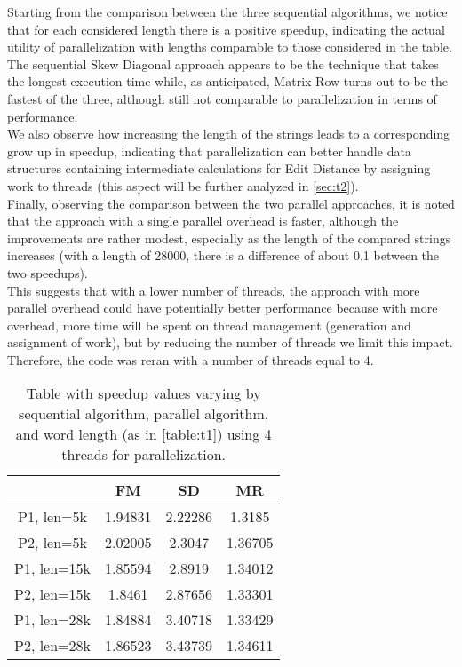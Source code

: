 \documentclass[10pt,twocolumn,letterpaper]{article}
\begin{document}
Starting from the comparison between the three sequential algorithms, we notice that for each considered length there is a positive speedup, indicating the actual utility of parallelization with lengths comparable to those considered in the table. The sequential Skew Diagonal approach appears to be the technique that takes the longest execution time while, as anticipated, Matrix Row turns out to be the fastest of the three, although still not comparable to parallelization in terms of performance.\\
We also observe how increasing the length of the strings leads to a corresponding grow up in speedup, indicating that parallelization can better handle data structures containing intermediate calculations for Edit Distance by assigning work to threads (this aspect will be further analyzed in \cref{sec:t2}).\\
Finally, observing the comparison between the two parallel approaches, it is noted that the approach with a single parallel overhead is faster, although the improvements are rather modest, especially as the length of the compared strings increases (with a length of 28000, there is a difference of about 0.1 between the two speedups).\\
This suggests that with a lower number of threads, the approach with more parallel overhead could have potentially better performance because with more overhead, more time will be spent on thread management (generation and assignment of work), but by reducing the number of threads we limit this impact.\\
Therefore, the code was reran with a number of threads equal to 4.

\begin{table}[h]
\centering
\begin{tabular}{ |c|c|c|c| } 
\hline
 & FM & SD & MR\\
\hline
P1, len=5k & 1.94831 & 2.22286 & 1.3185\\
\hline
P2, len=5k & 2.02005 & 2.3047 & 1.36705\\
\hline
P1, len=15k & 1.85594 & 2.8919 & 1.34012\\
\hline
P2, len=15k & 1.8461 & 2.87656 & 1.33301\\
\hline
P1, len=28k & 1.84884 & 3.40718 & 1.33429\\
\hline
P2, len=28k & 1.86523 & 3.43739 & 1.34611\\
\hline
\end{tabular}
\vspace*{3mm}
\caption{
Table with speedup values varying by sequential algorithm, parallel algorithm, and word length (as in \cref{table:t1}) using 4 threads for parallelization.}
\label{table:t2}
\end{table}
\end{document}
